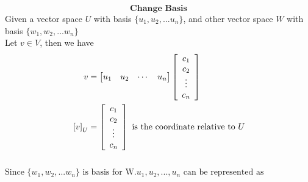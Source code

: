 \documentclass[10pt]{article}
\begin{document}
    \[ \textbf{Change Basis} \]
    Given a vector space $U$ with basis $\{u_1, u_2, ... u_n \}$, and other vector space $W$ with basis
    $\{w_1, w_2, ... w_n \}$ \\
    Let $v \in V$, then we have
    \begin{equation}
    \begin{aligned} 
        v &=  
        \begin{bmatrix}
        u_1 & u_2 & \cdots & u_n  
        \end{bmatrix}
        \left[ \begin{array}{cc} 
        c_1 \\
        c_2 \\
        \vdots \\
        c_n
        \end{array}          
        \right]    \label{eq:one} \\
        \newline 
        \left[v \right]_U &= 
        \left[ \begin{array}{cc} 
        c_1 \\
        c_2 \\
        \vdots \\
        c_n
        \end{array} 
        \right]  \mbox{ is the coordinate relative to } U  
    \end{aligned} 
    \end{equation}\\
    $\mbox{Since } \{w_1, w_2, ... w_n \} \mbox{ is basis for W}. u_1, u_2, ..., u_n  \mbox{ can be represented as} $
\end{document}
